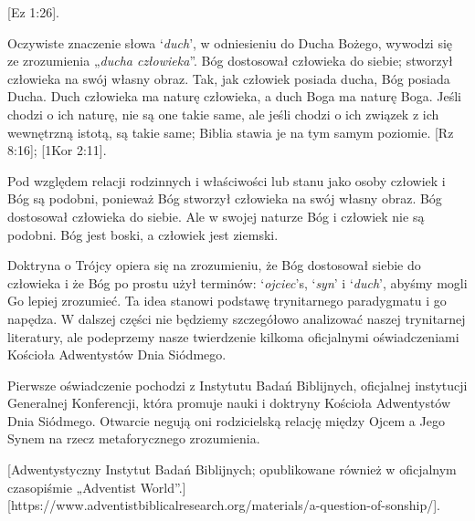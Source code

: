 [Ez 1:26].

Oczywiste znaczenie słowa ‘\textit{duch}’, w odniesieniu do Ducha Bożego, wywodzi się ze zrozumienia „\textit{ducha człowieka}”. Bóg dostosował człowieka do siebie; stworzył człowieka na swój własny obraz. Tak, jak człowiek posiada ducha, Bóg posiada Ducha. Duch człowieka ma naturę człowieka, a duch Boga ma naturę Boga. Jeśli chodzi o ich naturę, nie są one takie same, ale jeśli chodzi o ich związek z ich wewnętrzną istotą, są takie same; Biblia stawia je na tym samym poziomie. [Rz 8:16]; [1Kor 2:11].

Pod względem relacji rodzinnych i właściwości lub stanu jako osoby człowiek i Bóg są podobni, ponieważ Bóg stworzył człowieka na swój własny obraz. Bóg dostosował człowieka do siebie. Ale w swojej naturze Bóg i człowiek nie są podobni. Bóg jest boski, a człowiek jest ziemski.

Doktryna o Trójcy opiera się na zrozumieniu, że Bóg dostosował siebie do człowieka i że Bóg po prostu użył terminów: ‘\textit{ojciec}’s, ‘\textit{syn}’ i ‘\textit{duch}’, abyśmy mogli Go lepiej zrozumieć. Ta idea stanowi podstawę trynitarnego paradygmatu i go napędza. W dalszej części nie będziemy szczegółowo analizować naszej trynitarnej literatury, ale podeprzemy nasze twierdzenie kilkoma oficjalnymi oświadczeniami Kościoła Adwentystów Dnia Siódmego.

Pierwsze oświadczenie pochodzi z Instytutu Badań Biblijnych, oficjalnej instytucji Generalnej Konferencji, która promuje nauki i doktryny Kościoła Adwentystów Dnia Siódmego. Otwarcie negują oni rodzicielską relację między Ojcem a Jego Synem na rzecz metaforycznego zrozumienia.

[Adwentystyczny Instytut Badań Biblijnych; opublikowane również w oficjalnym czasopiśmie „Adventist World”.][https://www.adventistbiblicalresearch.org/materials/a-question-of-sonship/].

